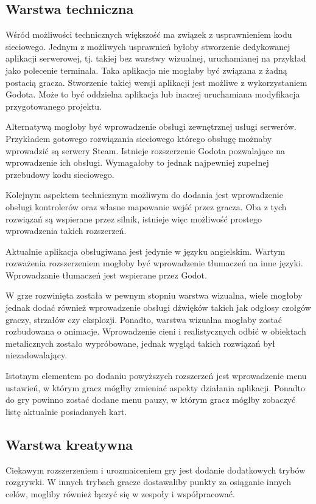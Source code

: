 \subsection{Warstwa techniczna}
Wśród możliwości technicznych większość ma związek z usprawnieniem kodu sieciowego. Jednym z możliwych usprawnień byłoby stworzenie dedykowanej aplikacji serwerowej, tj. takiej bez warstwy wizualnej, uruchamianej na przykład jako polecenie terminala. Taka aplikacja nie mogłaby być związana z żadną postacią gracza. Stworzenie takiej wersji aplikacji jest możliwe z wykorzystaniem Godota. Może to być oddzielna aplikacja lub inaczej uruchamiana modyfikacja przygotowanego projektu.

Alternatywą mogłoby być wprowadzenie obsługi zewnętrznej usługi serwerów. Przykładem gotowego rozwiązania sieciowego którego obsługę możnaby wprowadzić są serwery Steam. Istnieje rozszerzenie Godota pozwalające na wprowadzenie ich obsługi. Wymagałoby to jednak najpewniej zupełnej przebudowy kodu sieciowego.

Kolejnym aspektem technicznym możliwym do dodania jest wprowadzenie obsługi kontrolerów oraz własne mapowanie wejść przez gracza. Oba z tych rozwiązań są wspierane przez silnik, istnieje więc możliwość prostego wprowadzenia takich rozszerzeń.

Aktualnie aplikacja obsługiwana jest jedynie w języku angielskim. Wartym rozważenia rozszerzeniem mogłoby być wprowadzenie tłumaczeń na inne języki. Wprowadzanie tłumaczeń jest wspierane przez Godot.

W grze rozwinięta została w pewnym stopniu warstwa wizualna, wiele mogłoby jednak dodać również wprowadzenie obsługi dźwięków takich jak odgłosy czołgów graczy, strzałów czy eksplozji. Ponadto, warstwa wizualna mogłaby zostać rozbudowana o animacje. Wprowadzenie cieni i realistycznych odbić w obiektach metalicznych zostało wypróbowane, jednak wygląd takich rozwiązań był niezadowalający.

Istotnym elementem po dodaniu powyższych rozszerzeń jest wprowadzenie menu ustawień, w którym gracz mógłby zmieniać aspekty działania aplikacji. Ponadto do gry powinno zostać dodane menu pauzy, w którym gracz mógłby zobaczyć listę aktualnie posiadanych kart.

\subsection{Warstwa kreatywna}
Ciekawym rozszerzeniem i urozmaiceniem gry jest dodanie dodatkowych trybów rozgrywki. W innych trybach gracze dostawaliby punkty za osiąganie innych celów, mogliby również łączyć się w zespoły i współpracować.

